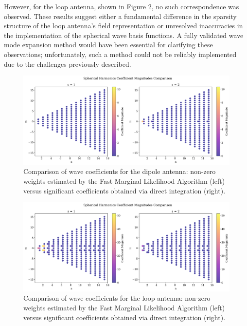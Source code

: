 \documentclass{article}
\begin{document}
However, for the loop antenna, shown in Figure \ref{fig:loop_weights}, no such correspondence was observed. These results suggest either a fundamental difference in the sparsity structure of the loop antenna’s field representation or unresolved inaccuracies in the implementation of the spherical wave basis functions. A fully validated wave mode expansion method would have been essential for clarifying these observations; unfortunately, such a method could not be reliably implemented due to the challenges previously described.

\begin{figure}[H]
    \centering
    \includegraphics[width=1\linewidth]{Figures/dipole_ff_weights.png}
    \caption{Comparison of wave coefficients for the dipole antenna: non-zero weights estimated by the Fast Marginal Likelihood Algorithm (left) versus significant coefficients obtained via direct integration (right).}
    \label{fig:dipole_weights}
\end{figure}

\begin{figure}[H]
    \centering
    \includegraphics[width=1\linewidth]{Figures/loop_ff_weights.png}
    \caption{Comparison of wave coefficients for the loop antenna: non-zero weights estimated by the Fast Marginal Likelihood Algorithm (left) versus significant coefficients obtained via direct integration (right).}
    \label{fig:loop_weights}
\end{figure}



\end{document}
